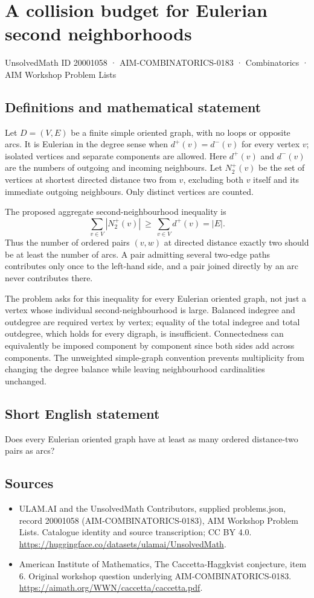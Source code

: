 \documentclass[11pt,a4paper]{article}
\begin{document}
\section*{A collision budget for Eulerian second neighborhoods}\label{20001058}
{\small UnsolvedMath ID 20001058 · AIM-COMBINATORICS-0183 · Combinatorics · AIM Workshop Problem Lists}
\subsection{Definitions and mathematical statement}
Let $D=(V,E)$ be a finite simple oriented graph, with no loops or
opposite arcs. It is Eulerian in the degree sense when
$d^+(v)=d^-(v)$ for every vertex $v$; isolated vertices and separate
components are allowed. Here $d^+(v)$ and $d^-(v)$ are the numbers
of outgoing and incoming neighbours.
Let $N_2^+(v)$ be the set of vertices at shortest directed distance
two from $v$, excluding both $v$ itself and its immediate outgoing
neighbours. Only distinct vertices are counted.

The proposed aggregate second-neighbourhood inequality is
\[
                       \sum_{v\in V}|N_2^+(v)|
                              \ \ge\ \sum_{v\in V}d^+(v)=|E|.
\]
Thus the number of ordered pairs $(v,w)$ at directed distance exactly
two should be at least the number of arcs. A pair admitting several
two-edge paths contributes only once to the left-hand side, and a
pair joined directly by an arc never contributes there.

The problem asks for this inequality for every Eulerian oriented
graph, not just a vertex whose individual second-neighbourhood is
large. Balanced indegree and outdegree are required vertex by vertex;
equality of the total indegree and total outdegree, which holds for
every digraph, is insufficient. Connectedness can equivalently be
imposed component by component since both sides add across components.
The unweighted simple-graph convention prevents multiplicity from
changing the degree balance while leaving neighbourhood cardinalities
unchanged.
\subsection{Short English statement}
Does every Eulerian oriented graph have at least as many ordered distance-two pairs as arcs?
\subsection{Sources}
\begin{itemize}
\item[S1] ULAM.AI and the UnsolvedMath Contributors, supplied problems.json, record 20001058 (AIM-COMBINATORICS-0183), AIM Workshop Problem Lists. Catalogue identity and source transcription; CC BY 4.0.
\url{https://huggingface.co/datasets/ulamai/UnsolvedMath}.
\item[S2] American Institute of Mathematics, The Caccetta-Haggkvist conjecture, item 6. Original workshop question underlying AIM-COMBINATORICS-0183.
\url{https://aimath.org/WWN/caccetta/caccetta.pdf}.
\end{itemize}
\end{document}
